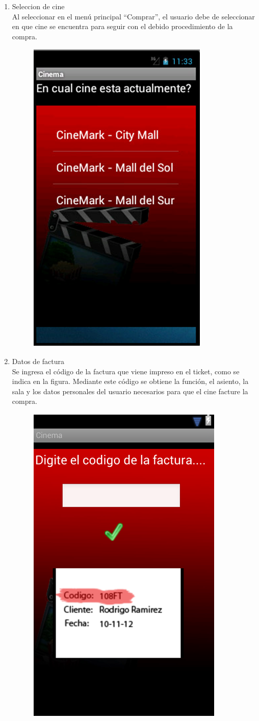 \documentclass[20pt]{article}
\begin{document}
\begin{enumerate}
\item Seleccion de cine\\Al seleccionar en el menú principal “Comprar”, el usuario debe de seleccionar en que cine se encuentra para seguir con el debido procedimiento de la compra.
\begin{figure}[h]
\begin{center}
\includegraphics[width=100 pt]{./seleccion_de_cine.jpg}
\end{center}
\end{figure}

\item Datos de factura\\
Se ingresa el código de la factura que viene impreso en el ticket, como se indica en la figura.
Mediante este código se obtiene la función, el asiento, la sala y los datos personales del usuario necesarios para que el cine facture la compra.

\begin{figure}[h]
\begin{center}
\includegraphics[width=100 pt]{./datos_de_factura.jpg}
\end{center}
\end{figure}


\end{enumerate}
\end{document}
